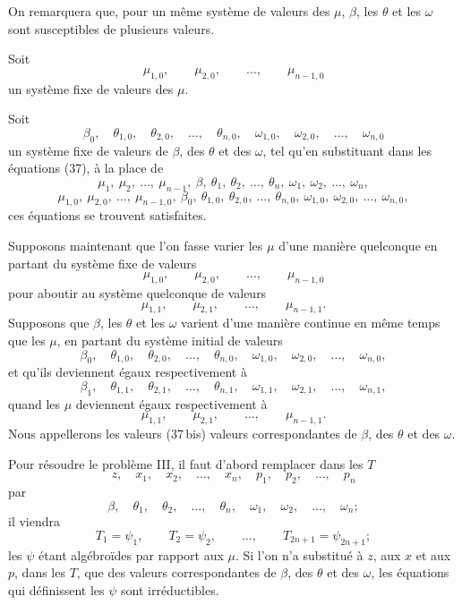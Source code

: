 \documentclass[11pt]{article}
\begin{document}
On remarquera que, pour un même système de valeurs des $\mu$, $\beta$, les $\theta$ et les $\omega$ sont susceptibles de plusieurs valeurs.

Soit
\[
\mu_{1,0},\qquad \mu_{2,0},\qquad \ldots,\qquad \mu_{n-1,0}
\]
un système fixe de valeurs des $\mu$.

Soit
\[
\beta_0,\quad \theta_{1,0},\quad \theta_{2,0},\quad \ldots,\quad \theta_{n,0},\quad
\omega_{1,0},\quad \omega_{2,0},\quad \ldots,\quad \omega_{n,0}
\]
un système fixe de valeurs de $\beta$, des $\theta$ et des $\omega$, tel qu’en substituant dans les équations (37), à la place de
\[
\mu_1,\ \mu_2,\ \ldots,\ \mu_{n-1},\ \beta,\ \theta_1,\ \theta_2,\ \ldots,\ \theta_n,\ \omega_1,\ \omega_2,\ \ldots,\ \omega_n,
\]
\[
\mu_{1,0},\ \mu_{2,0},\ \ldots,\ \mu_{n-1,0},\ \beta_0,\ \theta_{1,0},\ \theta_{2,0},\ \ldots,\ \theta_{n,0},\ \omega_{1,0},\ \omega_{2,0},\ \ldots,\ \omega_{n,0},
\]
ces équations se trouvent satisfaites.

Supposons maintenant que l’on fasse varier les $\mu$ d’une manière quelconque en partant du système fixe de valeurs
\[
\mu_{1,0},\qquad \mu_{2,0},\qquad \ldots,\qquad \mu_{n-1,0}
\]
pour aboutir au système quelconque de valeurs
\[
\mu_{1,1},\qquad \mu_{2,1},\qquad \ldots,\qquad \mu_{n-1,1}.
\]
Supposons que $\beta$, les $\theta$ et les $\omega$ varient d’une manière continue en même temps que les $\mu$, en partant du système initial de valeurs
\[
\beta_0,\quad \theta_{1,0},\quad \theta_{2,0},\quad \ldots,\quad \theta_{n,0},\quad
\omega_{1,0},\quad \omega_{2,0},\quad \ldots,\quad \omega_{n,0},
\]
et qu’ils deviennent égaux respectivement à
\begin{equation*}\tag{37\,bis}
\beta_1,\quad \theta_{1,1},\quad \theta_{2,1},\quad \ldots,\quad \theta_{n,1},\quad
\omega_{1,1},\quad \omega_{2,1},\quad \ldots,\quad \omega_{n,1},
\end{equation*}
quand les $\mu$ deviennent égaux respectivement à
\[
\mu_{1,1},\qquad \mu_{2,1},\qquad \ldots,\qquad \mu_{n-1,1}.
\]
Nous appellerons les valeurs (37\,bis) valeurs correspondantes de $\beta$, des $\theta$ et des $\omega$.

Pour résoudre le problème III, il faut d’abord remplacer dans les $T$
\[
z,\quad x_1,\quad x_2,\quad \ldots,\quad x_n,\quad p_1,\quad p_2,\quad \ldots,\quad p_n
\]
par
\[
\beta,\quad \theta_1,\quad \theta_2,\quad \ldots,\quad \theta_n,\quad \omega_1,\quad \omega_2,\quad \ldots,\quad \omega_n;
\]
il viendra
\[
T_1=\psi_1,\qquad T_2=\psi_2,\qquad \ldots,\qquad T_{2n+1}=\psi_{2n+1};
\]
les $\psi$ étant algébroïdes par rapport aux $\mu$. Si l’on n’a substitué à $z$, aux $x$ et aux $p$, dans les $T$, que des valeurs correspondantes de $\beta$, des $\theta$ et des $\omega$, les équations qui définissent les $\psi$ sont irréductibles.
\end{document}
